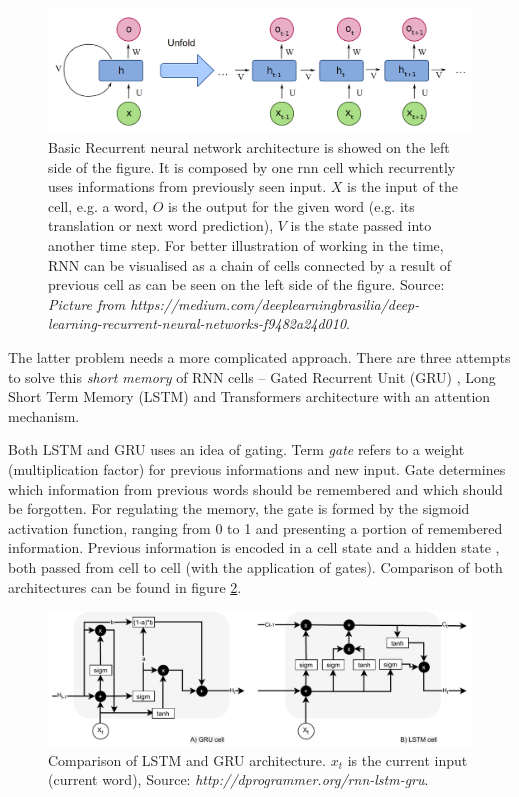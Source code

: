 \begin{figure}[ht]
\centering
\includegraphics[width=1\columnwidth]{../img/rnn}
\protect\caption{Basic Recurrent neural network architecture is showed on the left side of the figure. It is composed by one rnn cell which recurrently uses informations from previously seen input. $X$ is the input of the cell, e.g. a word, $O$ is the output for the given word (e.g. its translation or next word prediction), $V$ is the state passed into another time step. For better illustration of working in the time, RNN can be visualised as a chain of cells connected by a result of previous cell as can be seen on the left side of the figure. Source: \textit{Picture from https://medium.com/deeplearningbrasilia/deep-learning-recurrent-neural-networks-f9482a24d010}.}
\label{pic:rnn}
\end{figure}

The latter problem needs a more complicated approach. There are three attempts to solve this \textit{short memory} of RNN cells -- Gated Recurrent Unit (GRU) \citep{Cho2014}, Long Short Term Memory (LSTM) \citep{Hochreiter1997} and Transformers architecture \citep{Vaswani2017} with an attention mechanism.
\par
Both LSTM and GRU uses an idea of gating. Term \textit{gate} refers to a weight (multiplication factor) for previous informations and new input. Gate determines which information from previous words should be remembered and which should be forgotten. For regulating the memory, the gate is formed by the sigmoid activation function, ranging from 0 to 1 and presenting a portion of remembered information. Previous information is encoded in a cell state and a hidden state %
, both passed from cell to cell (with the application of gates). Comparison of both architectures can be found in figure \ref{pic:lstm_gru}.

\begin{figure}[ht]
\centering
\includegraphics[width=1\columnwidth]{../img/rnn_lstm_gru}
\protect\caption{Comparison of LSTM and GRU architecture. $x_t$ is the current input (current word),  Source: \textit{http://dprogrammer.org/rnn-lstm-gru}.}
\label{pic:lstm_gru}
\end{figure}
